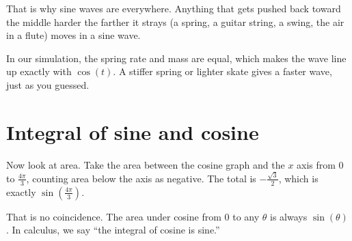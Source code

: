 That is why sine waves are everywhere. Anything that gets pushed back
toward the middle harder the farther it strays (a spring, a guitar string,
a swing, the air in a flute) moves in a sine wave.

In our simulation, the spring rate and mass are equal, which makes the
wave line up exactly with $\cos(t)$. A stiffer spring or lighter skate
gives a faster wave, just as you guessed.

\section{Integral of sine and cosine}

Now look at area. Take the area between the cosine graph and the $x$ axis
from 0 to $\frac{4\pi}{3}$, counting area below the axis as negative. The
total is $-\frac{\sqrt{3}}{2}$, which is exactly $\sin(\frac{4\pi}{3})$.


That is no coincidence. The area under cosine from 0 to any $\theta$ is
always $\sin(\theta)$. In calculus, we say ``the integral of cosine is sine.'' 

